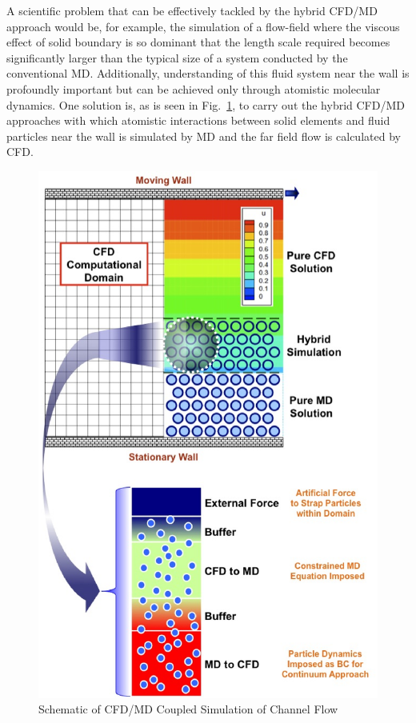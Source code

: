 \documentclass[conference,final]{IEEEtran}
\begin{document}
A scientific problem that can be effectively tackled by the hybrid CFD/MD approach would be, for example, the simulation of a flow-field where the viscous effect of solid boundary is so dominant that the length scale required becomes significantly larger than the typical size of a system conducted by the conventional MD.  Additionally, understanding of this fluid system near the wall is profoundly important but can be achieved only through atomistic molecular dynamics.   One solution is, as is seen in Fig.~\ref{Fig:Couette}, to carry out the hybrid CFD/MD approaches with which atomistic interactions between solid elements and fluid particles near the wall is simulated by MD and the far field flow is calculated by CFD. 

\begin{figure}
\centering
\includegraphics[scale=0.45]{fig1.eps}
\caption{\small Schematic of CFD/MD Coupled Simulation of Channel Flow}
\label{Fig:Couette}
\end{figure}
\end{document}

